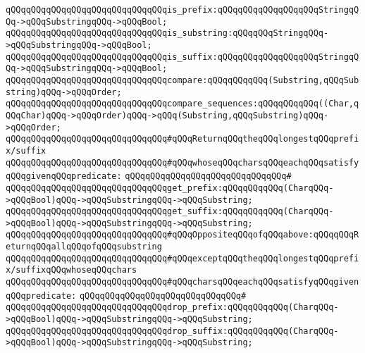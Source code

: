 \newline
\verb|qQQqqQQqqQQqqQQqqQQqqQQqqQQqqQQqis_prefix:qQQqqQQqqQQqqQQqqQQqStringqQQq->qQQqSubstringqQQq->qQQqBool;|\newline
\verb|qQQqqQQqqQQqqQQqqQQqqQQqqQQqqQQqis_substring:qQQqqQQqStringqQQq->qQQqSubstringqQQq->qQQqBool;|\newline
\verb|qQQqqQQqqQQqqQQqqQQqqQQqqQQqqQQqis_suffix:qQQqqQQqqQQqqQQqqQQqStringqQQq->qQQqSubstringqQQq->qQQqBool;|\newline
\newline
\verb|qQQqqQQqqQQqqQQqqQQqqQQqqQQqqQQqcompare:qQQqqQQqqQQq(Substring,qQQqSubstring)qQQq->qQQqOrder;|\newline
\verb|qQQqqQQqqQQqqQQqqQQqqQQqqQQqqQQqcompare_sequences:qQQqqQQqqQQq((Char,qQQqChar)qQQq->qQQqOrder)qQQq->qQQq(Substring,qQQqSubstring)qQQq->qQQqOrder;|\newline
\newline
\verb|qQQqqQQqqQQqqQQqqQQqqQQqqQQqqQQq#qQQqReturnqQQqtheqQQqlongestqQQqprefix/suffix|\newline
\verb|qQQqqQQqqQQqqQQqqQQqqQQqqQQqqQQq#qQQqwhoseqQQqcharsqQQqeachqQQqsatisfyqQQqgivenqQQqpredicate:|\newline
\verb|qQQqqQQqqQQqqQQqqQQqqQQqqQQqqQQq#|\newline
\verb|qQQqqQQqqQQqqQQqqQQqqQQqqQQqqQQqget_prefix:qQQqqQQqqQQq(CharqQQq->qQQqBool)qQQq->qQQqSubstringqQQq->qQQqSubstring;|\newline
\verb|qQQqqQQqqQQqqQQqqQQqqQQqqQQqqQQqget_suffix:qQQqqQQqqQQq(CharqQQq->qQQqBool)qQQq->qQQqSubstringqQQq->qQQqSubstring;|\newline
\newline
\verb|qQQqqQQqqQQqqQQqqQQqqQQqqQQqqQQq#qQQqOppositeqQQqofqQQqabove:qQQqqQQqReturnqQQqallqQQqofqQQqsubstring|\newline
\verb|qQQqqQQqqQQqqQQqqQQqqQQqqQQqqQQq#qQQqexceptqQQqtheqQQqlongestqQQqprefix/suffixqQQqwhoseqQQqchars|\newline
\verb|qQQqqQQqqQQqqQQqqQQqqQQqqQQqqQQq#qQQqcharsqQQqeachqQQqsatisfyqQQqgivenqQQqpredicate:|\newline
\verb|qQQqqQQqqQQqqQQqqQQqqQQqqQQqqQQq#|\newline
\verb|qQQqqQQqqQQqqQQqqQQqqQQqqQQqqQQqdrop_prefix:qQQqqQQqqQQq(CharqQQq->qQQqBool)qQQq->qQQqSubstringqQQq->qQQqSubstring;|\newline
\verb|qQQqqQQqqQQqqQQqqQQqqQQqqQQqqQQqdrop_suffix:qQQqqQQqqQQq(CharqQQq->qQQqBool)qQQq->qQQqSubstringqQQq->qQQqSubstring;|\newline
